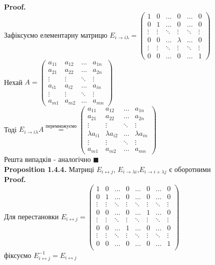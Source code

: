 \documentclass[a4paper, 14pt]{extarticle}
\def\prp#1{\textbf{Proposition {#1}}}
\def\proof{\textbf{Proof.}\\}
\def\bigline{\vspace{5mm}\\}
\def\qed{$\blacksquare$}
\begin{document}
	\proof
	Зафіксуємо елементарну матрицю $E_{i \rightarrow i \lambda} = \begin{pmatrix}
	1 & 0 & \dots & 0 & \dots & 0 \\
	0 & 1 & \dots & 0 & \dots & 0 \\
	\vdots & \vdots & \ddots & \vdots & \ddots & \vdots \\
	0 & 0 & \dots & \lambda & \dots & 0 \\
	\vdots & \vdots & \ddots & \vdots & \ddots & \vdots \\
	0 & 0 & \dots & 0 & \dots & 1
\end{pmatrix}$\\
	Нехай $A = \begin{pmatrix}
	a_{11} & a_{12} & \dots & a_{1n} \\
	a_{21} & a_{22} & \dots & a_{2n} \\
	\vdots & \vdots & \ddots & \vdots \\
	a_{i1} & a_{i2} & \dots & a_{in} \\
	\vdots & \vdots & \ddots & \vdots \\
	a_{m1} & a_{m2} & \dots & a_{mn}
	\end{pmatrix}$ \\
	Тоді $E_{i \rightarrow i\lambda} A \overset{\textrm{перемножуємо}}{=} \begin{pmatrix}
	a_{11} & a_{12} & \dots & a_{1n} \\
	a_{21} & a_{22} & \dots & a_{2n} \\
	\vdots & \vdots & \ddots & \vdots \\
	\lambda a_{i1} & \lambda a_{i2} & \dots & \lambda a_{in} \\
	\vdots & \vdots & \ddots & \vdots \\
	a_{m1} & a_{m2} & \dots & a_{mn}
	\end{pmatrix}$\\
	Решта випадків - аналогічно \qed
	\bigline
	\prp{1.4.4.} Матриці $E_{i \leftrightarrow j}$, $E_{i \rightarrow \lambda i}$,$E_{i \rightarrow i + \lambda j}$ є оборотними\\
	\proof
	Для перестановки $E_{i \leftrightarrow j} = \begin{pmatrix}
	1 & 0 & \dots & 0 & \dots & 0 & \dots & 0 \\
	0 & 1 & \dots & 0 & \dots & 0 & \dots & 0 \\
	\vdots & \vdots &\ddots & \vdots & \ddots & \vdots & \ddots & \vdots \\
	0 & 0 & \dots & 0 & \dots & 1 & \dots & 0 \\
	\vdots & \vdots &\ddots & \vdots & \ddots & \vdots & \ddots & \vdots \\
	0 & 0 & \dots & 1 & \dots & 0 & \dots & 0 \\
	\vdots & \vdots &\ddots & \vdots & \ddots & \vdots & \ddots & \vdots \\
	0 & 0 & \dots & 0 & \dots & 0 & \dots & 1 \\
	\end{pmatrix}$ \\ фіксуємо $E_{i \leftrightarrow j}^{-1} = E_{i \leftrightarrow j}$\\
\end{document}
